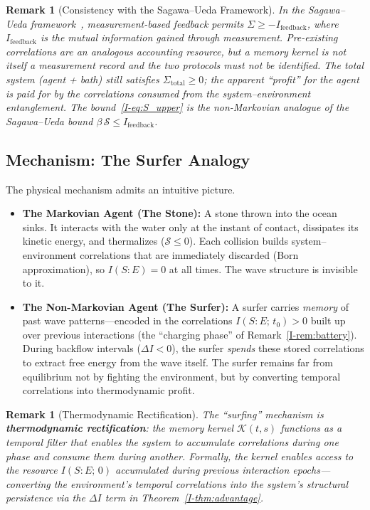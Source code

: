 \documentclass[12pt,a4paper,openany]{book}
\newtheorem{remark}[theorem]{Remark}
\begin{document}
\begin{remark}[Consistency with the Sagawa--Ueda Framework]
\label{I-rem:SU_consistency}
In the Sagawa--Ueda framework~\cite{SagawaUeda2010,SagawaUeda2012},
measurement-based feedback permits
$\Sigma \geq -I_{\mathrm{feedback}}$, where
$I_{\mathrm{feedback}}$ is the mutual information gained
through measurement.
Pre-existing correlations are an analogous accounting resource, but a
memory kernel is not itself a measurement record and the two protocols
must not be identified.
The total system (agent + bath) still satisfies
$\Sigma_{\mathrm{total}} \geq 0$; the apparent ``profit'' for
the agent is paid for by the correlations consumed from the
system--environment entanglement.
The bound~\eqref{I-eq:S_upper} is the non-Markovian analogue of
the Sagawa--Ueda bound $\beta\,\mathcal{S} \leq
I_{\mathrm{feedback}}$.
\end{remark}

\subsection{Mechanism: The Surfer Analogy}

The physical mechanism admits an intuitive picture.

\begin{itemize}
\item \textbf{The Markovian Agent (The Stone):}
A stone thrown into the ocean sinks.
It interacts with the water only at the instant of contact,
dissipates its kinetic energy, and thermalizes
($\mathcal{S} \leq 0$).
Each collision builds system--environment correlations that are
immediately discarded (Born approximation), so
$I(S{:}E) = 0$ at all times.
The wave structure is invisible to it.

\item \textbf{The Non-Markovian Agent (The Surfer):}
A surfer carries \emph{memory} of past wave patterns---encoded
in the correlations $I(S{:}E;\, t_0) > 0$ built up over
previous interactions (the ``charging phase'' of
Remark~\ref{I-rem:battery}).
During backflow intervals ($\Delta I < 0$), the surfer
\emph{spends} these stored correlations to extract free energy
from the wave itself.
The surfer remains far from equilibrium not by fighting the
environment, but by converting temporal correlations into
thermodynamic profit.
\end{itemize}

\begin{remark}[Thermodynamic Rectification]
\label{I-rem:rectification}
The ``surfing'' mechanism is \textbf{thermodynamic
rectification}: the memory kernel $\mathcal{K}(t,s)$ functions
as a temporal filter that enables the system to accumulate
correlations during one phase and consume them during another.
Formally, the kernel enables access to the resource
$I(S{:}E;\, 0)$ accumulated during previous interaction
epochs---converting the environment's temporal correlations
into the system's structural persistence via the
$\Delta I$ term in Theorem~\ref{I-thm:advantage}.
\end{remark}
\end{document}
